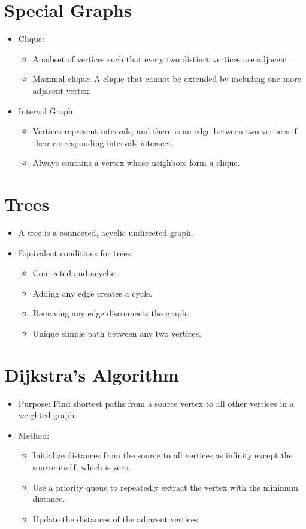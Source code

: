 \documentclass{article}
\begin{document}
\section*{Special Graphs}
\begin{itemize}
    \item Clique:
    \begin{itemize}
        \item A subset of vertices such that every two distinct vertices are adjacent.
        \item Maximal clique: A clique that cannot be extended by including one more adjacent vertex.
    \end{itemize}
    \item Interval Graph:
    \begin{itemize}
        \item Vertices represent intervals, and there is an edge between two vertices if their corresponding intervals intersect.
        \item Always contains a vertex whose neighbors form a clique.
    \end{itemize}
\end{itemize}

\section*{Trees}
\begin{itemize}
    \item A tree is a connected, acyclic undirected graph.
    \item Equivalent conditions for trees:
    \begin{itemize}
        \item Connected and acyclic.
        \item Adding any edge creates a cycle.
        \item Removing any edge disconnects the graph.
        \item Unique simple path between any two vertices.
    \end{itemize}
\end{itemize}

\section*{Dijkstra's Algorithm}
\begin{itemize}
    \item Purpose: Find shortest paths from a source vertex to all other vertices in a weighted graph.
    \item Method:
    \begin{itemize}
        \item Initialize distances from the source to all vertices as infinity except the source itself, which is zero.
        \item Use a priority queue to repeatedly extract the vertex with the minimum distance.
        \item Update the distances of the adjacent vertices.
    \end{itemize}
\end{itemize}
\end{document}
